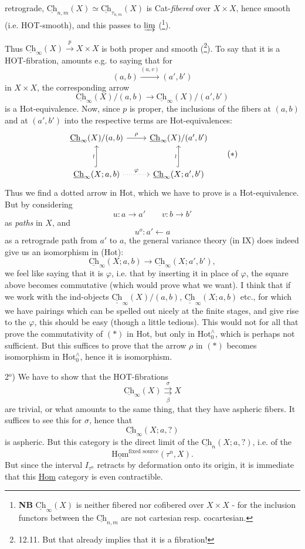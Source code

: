 \documentclass[11pt]{article}
\newcommand{\printedpage}[1]{\marginpar{\footnotesize p.~#1}}
\newcommand{\msp}[1]{\marginpar{\footnotesize [#1]}}
\newcommand{\Ch}{\underline{\mathrm{Ch}}}
\newcommand{\CCh}{\underline{\underline{\mathrm{Ch}}}}
\newcommand{\Hotz}{\mathrm{Hot}^{\wedge}_{0}}
\begin{document}
\printedpage{94}
retrograde, $\Ch_{n,m}(X) \simeq \Ch_{\tau_{n,m}}(X)$ is Cat-\textit{fibered} over $X \times X$, hence smooth (i.e. HOT-smooth), and this passes to $\varinjlim$ (\footnote[36]{\textbf{NB} $\Ch_\infty(X)$ is neither fibered nor cofibered over $X \times X$ - for the inclusion functors between the $\Ch_{n,m}$ are not cartesian resp. cocartesian.}).

Thus $\Ch_\infty(X) \xrightarrow{p} X \times X$ is both proper and smooth (\footnote[37]{12.11. But that already implies that it is a fibration!}). To say that it is a HOT-fibration, amounts e.g. to saying that for
\[
(a,b) \xrightarrow{(u,v)} (a',b')
\]
in $X \times X$, the corresponding arrow
\[
\Ch_\infty(X)/(a,b) \longrightarrow \Ch_\infty(X)/(a',b')
\]
is a Hot-equivalence. Now, since $p$ is proper, the inclusions of the fibers at $(a,b)$ and at $(a',b')$ into the respective terms are Hot-equivalences:
\msp{page 151}
\[
\begin{tikzcd}[row sep=large]
\Ch_\infty(X)/(a,b) \arrow[r, "\rho"] & \Ch_\infty(X)/(a',b') \\
\Ch_\infty(X;a,b) \arrow[u, hook, "\wr"] \arrow[r, dotted, "\varphi"] & \Ch_\infty(X;a',b') \arrow[u, hook, "\wr"]
\end{tikzcd}
\tag*{$(*)$}
\]
Thus we find a dotted arrow in Hot, which we have to prove is a Hot-equivalence. But by considering
\[
u : a \longrightarrow a' \qquad v : b \longrightarrow b'
\]
as \textit{paths} in $X$, and
\[
u^o : a' \longleftarrow a
\]
as a retrograde path from $a'$ to $a$, the general variance theory (in IX) does indeed give us an isomorphism in (Hot):
\[
\Ch_\infty(X;a,b) \longrightarrow \Ch_\infty(X;a',b'),
\]
we feel like saying that it is $\varphi$, i.e. that by inserting it in place of $\varphi$, the square above becomes commutative (which would prove what we want). I think that if we work with the ind-objects $\CCh_\infty(X)/(a,b)$, $\CCh_\infty(X;a,b)$ etc., for which we have pairings which can be spelled out nicely at the finite stages, and give rise to the $\varphi$, this should be easy (though a little tedious). This would not for all that prove the commutativity of $(*)$ in Hot, but
\printedpage{95}
\msp{page 152}
only in $\Hotz$, which is perhaps not sufficient. But this suffices to prove that the arrow $\rho$ in $(*)$ becomes isomorphism in $\Hotz$, hence it is isomorphism.

2$^o$) We have to show that the HOT-fibrations
\[
\Ch_\infty(X) \overset{\sigma}{\underset{\beta}{\rightrightarrows}} X
\]
are trivial, or what amounts to the same thing, that they have aspheric fibers. It suffices to see this for $\sigma$, hence that
\[
\Ch_\infty(X;a,?)
\]
is aspheric. But this category is the direct limit of the $\Ch_n(X;a,?)$, i.e. of the
\[
\underline{\mathrm{Hom}}^{\text{fixed source}}(\tau^n, X).
\]
But since the interval $I_{\tau^n}$ retracts by deformation onto its origin, it is immediate that this \underline{Hom} category is even contractible.
\end{document}
